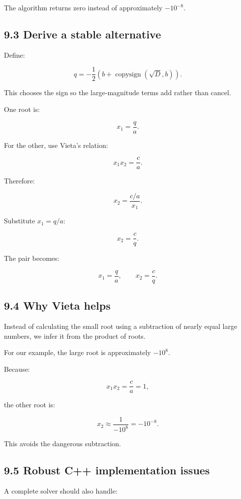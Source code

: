 The algorithm returns zero instead of approximately \(-10^{-8}\).

\subsection{9.3 Derive a stable alternative}\label{02-foundations-ii-ch028-derive-a-stable-alternative}

Define:

\[ \boxed{ q= -\frac12\left(b+\operatorname{copysign}(\sqrt D,b)\right) }. \]

This chooses the sign so the large-magnitude terms add rather than cancel.

One root is:

\[ \boxed{x_1=\frac qa}. \]

For the other, use Vieta's relation:

\[ x_1x_2=\frac ca. \]

Therefore:

\[ x_2=\frac{c/a}{x_1}. \]

Substitute \(x_1=q/a\):

\[ \boxed{x_2=\frac cq}. \]

The pair becomes:

\[ \boxed{ x_1=\frac qa, \qquad x_2=\frac cq }. \]

\subsection{9.4 Why Vieta helps}\label{02-foundations-ii-ch028-why-vieta-helps}

Instead of calculating the small root using a subtraction of nearly equal large numbers, we infer it from the product of roots.

For our example, the large root is approximately \(-10^8\).

Because:

\[ x_1x_2=\frac ca=1, \]

the other root is:

\[ x_2\approx\frac1{-10^8}=-10^{-8}. \]

This avoids the dangerous subtraction.

\subsection{9.5 Robust C++ implementation issues}\label{02-foundations-ii-ch028-robust-c-implementation-issues}

A complete solver should also handle:

